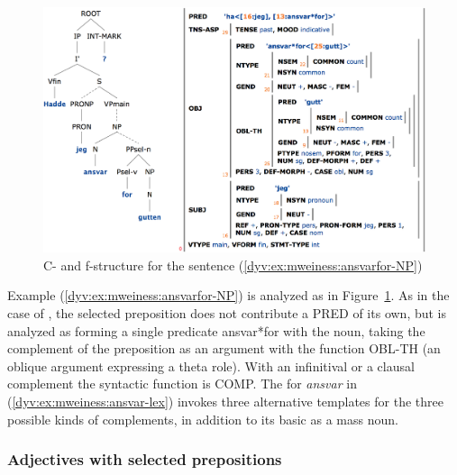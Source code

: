 \documentclass[output=paper]{langsci/langscibook}
\begin{document}
\begin{figure}
  \includegraphics[width=\textwidth]{figures/ansvarfor-NP-c-f.png}
  \caption{C- and f-structure for the sentence (\ref{dyv:ex:mweiness:ansvarfor-NP}) }
  \label{dyv:fig:mweiness:ansvarfor-NP-c-f}
\end{figure}

Example (\ref{dyv:ex:mweiness:ansvarfor-NP}) is analyzed as in Figure~\ref{dyv:fig:mweiness:ansvarfor-NP-c-f}.
As in the case of , the selected preposition does not contribute a \textsf{PRED} of its own, but is analyzed as forming a single predicate \textsf{ansvar*for} with the noun, taking the complement of the preposition as an argument with the function \textsf{OBL-TH} (an oblique argument expressing a theta role).
With an infinitival or a clausal complement the syntactic function is \textsf{COMP}.
The  for \textit{ansvar} in (\ref{dyv:ex:mweiness:ansvar-lex}) invokes three alternative templates for the three possible kinds of complements, in addition to its basic  as a mass noun.


\subsubsection{Adjectives with selected prepositions}\label{dyv:sec:mweiness:prepadj}
\end{document}
